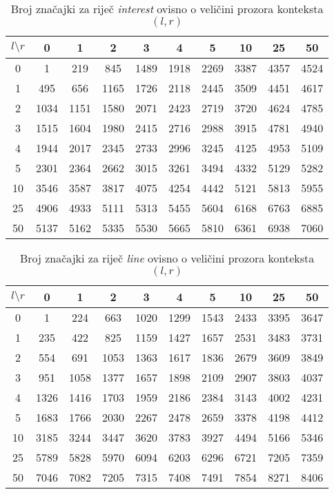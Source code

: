 \documentclass[10pt, a4paper]{article}
\begin{document}
\begin{table*}[!hbtp]
\caption{Broj značajki za riječ \emph{interest} ovisno o veličini prozora konteksta $(l,r)$}
\label{tab:interest_feature_set}
\begin{center}
\begin{tabular}{|c|ccccccccc|}
\hline
$l \setminus r$ & 0 & 1 & 2 & 3 & 4 & 5 & 10 & 25 & 50 \\
\hline
0 &  1 &  219 &  845 &  1489 &  1918 &  2269 &  3387 &  4357 &  4524 \\
1 &  495 &  656 &  1165 &  1726 &  2118 &  2445 &  3509 &  4451 &  4617\\
2 &  1034 &  1151 &  1580 &  2071 &  2423 &  2719 &  3720 &  4624 &  4785\\
3 &  1515 &  1604 &  1980 &  2415 &  2716 &  2988 &  3915 &  4781 &  4940\\
4 &  1944 &  2017 &  2345 &  2733 &  2996 &  3245 &  4125 &  4953 &  5109\\
5 &  2301 &  2364 &  2662 &  3015 &  3261 &  3494 &  4332 &  5129 &  5282\\
10 &  3546 &  3587 &  3817 &  4075 &  4254 &  4442 &  5121 &  5813 &  5955\\
25 &  4906 &  4933 &  5111 &  5313 &  5455 &  5604 &  6168 &  6763 &  6885\\
50 &  5137 &  5162 &  5335 &  5530 &  5665 &  5810 &  6361 &  6938 &  7060\\
\hline
\end{tabular}
\end{center}
\end{table*}

\begin{table*}[!hbtp]
\caption{Broj značajki za riječ \emph{line} ovisno o veličini prozora konteksta $(l,r)$}
\label{tab:line_feature_set}
\begin{center}
\begin{tabular}{|c|ccccccccc|}
\hline
$l \setminus r$ & 0 & 1 & 2 & 3 & 4 & 5 & 10 & 25 & 50 \\
\hline
0  &  1 &  224 &  663 &  1020 &  1299 &  1543 &  2433 &  3395 &  3647\\
1  &  235 &  422 &  825 &  1159 &  1427 &  1657 &  2531 &  3483 &  3731\\
2  &  554 &  691 &  1053 &  1363 &  1617 &  1836 &  2679 &  3609 &  3849\\
3  &  951 &  1058 &  1377 &  1657 &  1898 &  2109 &  2907 &  3803 &  4037\\
4  &  1326 &  1416 &  1703 &  1959 &  2186 &  2384 &  3143 &  4002 &  4231\\
5  &  1683 &  1766 &  2030 &  2267 &  2478 &  2659 &  3378 &  4198 &  4412\\
10 &  3185 &  3244 &  3447 &  3620 &  3783 &  3927 &  4494 &  5166 &  5346\\
25 &  5789 &  5828 &  5970 &  6094 &  6203 &  6296 &  6721 &  7205 &  7359\\
50 &  7046 &  7082 &  7205 &  7315 &  7408 &  7491 &  7854 &  8271 &  8406\\
\hline
\end{tabular}
\end{center}
\end{table*}
\end{document}
